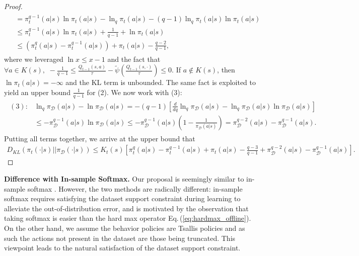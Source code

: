 \documentclass{article}
\newcommand{\AdaBracket}[1]{\left(#1\right)}
\newcommand{\AdaRectBracket}[1]{\left[#1\right]}
\newcommand{\KLany}[2]{D_{\!K\!L}\!\left(#1 \left|  \right| #2 \right)}
\newcommand{\eq}[1]{Eq.\,(#1)}
\newcommand{\datasetPolicy}{\pi_{\mathcal{D}}}
\begin{document}
\begin{proof}
\begin{align}
\begin{split}
        &= \pi_{t}^{q-1}(a|s)\ln\pi_t(a|s) - \ln_q\pi_t(a|s) - (q-1)\ln_q\pi_t(a|s)\ln\pi_t(a|s)\\
        & \leq \pi_{t}^{q-1}(a|s)\ln\pi_t(a|s) + \frac{1}{q-1} + \ln\pi_t (a|s)\\
        & \leq  \AdaBracket{ \pi_{t}^{q}(a|s) - \pi_{t}^{q-1} (a|s) } + \pi_t(a|s) - \frac{q-2}{q-1},
    \end{split}
\end{align}
where we leveraged $\ln x \leq x - 1$ and  the fact that $\forall a\in K(s), \,\, -\frac{1}{q-1} \leq \frac{Q_{t-1}(s,a)}{\tau} - \tilde{\psi}\AdaBracket{\frac{Q_{t-1}(s,\cdot)}{\tau}} \leq 0$. 
If $a \notin K(s)$, then $\ln\pi_t(a|s) = -\infty$ and the KL term is unbounded.
The same fact is exploited to yield an upper bound $\frac{1}{q-1}$  for (2).
We now work with (3):
\begin{align}
    \begin{split}
        (3): &\ln_q \datasetPolicy(a|s) - \ln\datasetPolicy(a|s) = -(q-1) \AdaRectBracket{\frac{d}{dq}\ln_q \datasetPolicy(a|s) - \ln_q\datasetPolicy(a|s)\ln\datasetPolicy(a|s)}\\
        & \leq -\datasetPolicy^{q-1}(a|s)\ln\datasetPolicy(a|s)  \leq  -\datasetPolicy^{q-1}(a|s)\AdaBracket{1 - \frac{1}{\datasetPolicy(a|s)} } = \datasetPolicy^{q-2}(a|s) - \datasetPolicy^{q-1}(a|s).
    \end{split}
\end{align}
Putting all terms together, we arrive at the upper bound that 
\begin{align*}
    \KLany{\pi_t(\cdot|s)}{\datasetPolicy(\cdot|s)} \leq K_{t}(s)\! \AdaRectBracket{  { \pi_{t}^{q}(a|s) - \pi_{t}^{q-1} (a|s) } + \pi_t(a|s) - \frac{q-3}{q-1}  + \datasetPolicy^{q-2}(a|s) - \datasetPolicy^{q-1}(a|s)}.
\end{align*}

\end{proof}

\textbf{Difference with In-sample Softmax. }
Our proposal is seemingly similar to in-sample softmax \cite{Xiao2023-InSampleSoftmax}.
However, the two methods are radically different: in-sample softmax requires satisfying the dataset support constraint during learning to alleviate the out-of-distribution error, and is motivated by the observation that taking softmax is easier than the hard max operator \eq{\ref{eq:hardmax_offline}}.
On the other hand, we assume the behavior policies are Tsallis policies and as such the actions not present in the dataset are those being truncated.
This viewpoint leads to the natural satisfaction of the dataset support constraint.
\end{document}

